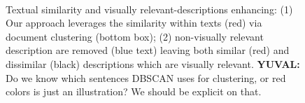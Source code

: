 \documentclass[11pt,a4paper]{article}
\newcommand\gal[1]{\textcolor{bright}{\textbf{GAL:} #1 }}
\newcommand\yuval[1]{\textcolor{darkpink}{\textbf{YUVAL:} #1 }}
\newcommand\tzuf[1]{\textcolor{blue}{\textbf{TZUF:} #1 }}
\begin{document}
\begin{figure}[t]
\centering
{}
 \caption{Textual similarity and visually relevant-descriptions enhancing: (1) Our approach leverages the similarity within %
 texts (red) via document clustering (bottom box);
 (2) non-visually relevant description are removed (blue text) leaving both similar (red) and dissimilar (black) descriptions which are visually relevant. \yuval{Do we know which sentences DBSCAN uses for clustering, or red colors is just an illustration? We should be explicit on that.} 
 }\ %
\label{fig:bird_example}%
\end{figure}
\end{document}
